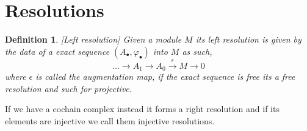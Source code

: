 \documentclass[12pt]{report}
\numberwithin{equation}{section}
\newcounter{dummy} \numberwithin{dummy}{section}
\newtheorem{definition}[dummy]{Definition}
\newtheorem{lemma}[dummy]{Lemma}
\begin{document}
%	
%	
	\section{Resolutions}
	
	\begin{definition}\label{defresolution}[Left resolution]
		Given a module $M$ its {left resolution} is given by the data of a exact sequence $(A_\bullet, \varphi_\bullet)$ into $M$ as such,
		\[ 	\dots \to A_1	\to A_0 \xrightarrow{\epsilon} M \to 0 \]
		where $\epsilon $ is called the {augmentation map}, if the exact sequence is free its a free resolution and such for projective. 
	\end{definition}
	
%	
	If we have a cochain complex instead it forms a {right resolution} and if its elements are injective we call them injective resolutions.
	
\end{document}
